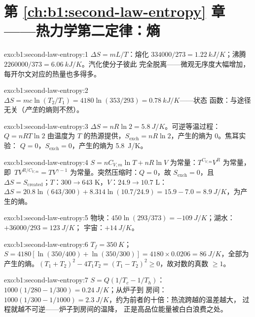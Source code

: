\section*{第 \ref{ch:b1:second-law-entropy} 章——热力学第二定律：熵}

\begin{solution}{exo:b1:second-law-entropy:1}
$\Delta S = mL/T$：熔化 $334000/273 = \qty{1.22}{kJ/K}$；沸腾 $2260000/
373 = \qty{6.06}{kJ/K}$。汽化使分子彼此
完全脱离——微观无序度大幅增加，
每开尔文对应的热量也多得多。
\end{solution}

\begin{solution}{exo:b1:second-law-entropy:2}
$\Delta S = mc\ln(T_2/T_1) = 4180\ln(353/293) = \qty{0.78}{kJ/K}$——状态
函数：与途径无关（\emph{产生}的熵则不然）。
\end{solution}

\begin{solution}{exo:b1:second-law-entropy:3}
$\Delta S = nR\ln2 = \qty{5.8}{J/K}$。可逆等温过程：$Q = nRT\ln2$
由温度为 $T$ 的热源提供，$S_{\mathrm{exch}} = nR\ln2$，产生的熵为 $0$。焦耳实验：
$Q = 0$，$S_{\mathrm{exch}} = 0$，产生的熵为 \qty{5.8}{J/K}。
\end{solution}

\begin{solution}{exo:b1:second-law-entropy:4}
$S = nC_{V,m}\ln T + nR\ln V$ 为常量：$T^{C_{V,m}}V^R$ 为常量，即\
$TV^{R/C_{V,m}} = TV^{\gamma - 1}$ 为常量。突然压缩时：$Q = 0$，故
$S_{\mathrm{exch}} = 0$，且 $\Delta S = S_{\mathrm{created}}$；$T$：$300 \to
643$ K，$V$：$24.9 \to 10.7$ L：$\Delta S = 20.8\ln(643/300) + 8.314\ln(10.7/
24.9) = 15.9 - 7.0 = \qty{+8.9}{J/K}$，为产生的熵。
\end{solution}

\begin{solution}{exo:b1:second-law-entropy:5}
物块：$450\ln(293/373) = \qty{-109}{J/K}$；湖水：$+36000/293 = \qty{+123}{J/K}$；
宇宙：$+\qty{14}{J/K}$。
\end{solution}

\begin{solution}{exo:b1:second-law-entropy:6}
$T_f = \qty{350}{K}$；$S = 4180[\ln(350/400) + \ln(350/300)] = 4180 \times
0.0206 = \qty{86}{J/K}$，全部为产生的熵。$(T_1 + T_2)^2 - 4T_1T_2 = (T_1 - T_2)^2
\geq 0$，故对数的真数 $\geq 1$。
\end{solution}

\begin{solution}{exo:b1:second-law-entropy:7}
$S = Q(1/T_c - 1/T_h)$：$1000(1/280 - 1/300) = \qty{0.24}{J/K}$；从炉子到
房间：$1000(1/300 - 1/1000) = \qty{2.3}{J/K}$，约为前者的十倍：热流跨越的温差越大，
过程就越不可逆——炉子到房间的温降，
正是高品位能量被白白浪费之处。
\end{solution}

